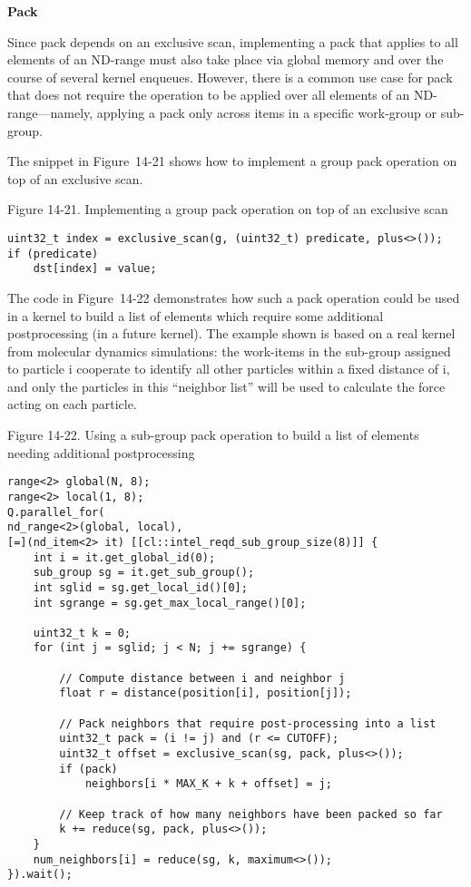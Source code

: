 \hspace*{\fill} \par %
\textbf{Pack}

Since pack depends on an exclusive scan, implementing a pack that applies to all elements of an ND-range must also take place via global memory and over the course of several kernel enqueues. However, there is a common use case for pack that does not require the operation to be applied over all elements of an ND-range—namely, applying a pack only across items in a specific work-group or sub-group.\par

The snippet in Figure 14-21 shows how to implement a group pack operation on top of an exclusive scan.\par

\hspace*{\fill} \par %
Figure 14-21. Implementing a group pack operation on top of an exclusive scan
\begin{lstlisting}[caption={}]
uint32_t index = exclusive_scan(g, (uint32_t) predicate, plus<>());
if (predicate)
	dst[index] = value;
\end{lstlisting}

The code in Figure 14-22 demonstrates how such a pack operation could be used in a kernel to build a list of elements which require some additional postprocessing (in a future kernel). The example shown is based on a real kernel from molecular dynamics simulations: the work-items in the sub-group assigned to particle i cooperate to identify all other particles within a fixed distance of i, and only the particles in this “neighbor list” will be used to calculate the force acting on each particle.\par

\hspace*{\fill} \par %
Figure 14-22. Using a sub-group pack operation to build a list of elements needing additional postprocessing
\begin{lstlisting}[caption={}]
range<2> global(N, 8);
range<2> local(1, 8);
Q.parallel_for(
nd_range<2>(global, local),
[=](nd_item<2> it) [[cl::intel_reqd_sub_group_size(8)]] {
	int i = it.get_global_id(0);
	sub_group sg = it.get_sub_group();
	int sglid = sg.get_local_id()[0];
	int sgrange = sg.get_max_local_range()[0];
	
	uint32_t k = 0;
	for (int j = sglid; j < N; j += sgrange) {
		
		// Compute distance between i and neighbor j
		float r = distance(position[i], position[j]);
		
		// Pack neighbors that require post-processing into a list
		uint32_t pack = (i != j) and (r <= CUTOFF);
		uint32_t offset = exclusive_scan(sg, pack, plus<>());
		if (pack)
			neighbors[i * MAX_K + k + offset] = j;
		
		// Keep track of how many neighbors have been packed so far
		k += reduce(sg, pack, plus<>());
	}
	num_neighbors[i] = reduce(sg, k, maximum<>());
}).wait();
\end{lstlisting}

